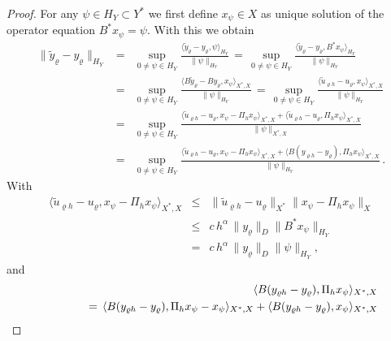 \documentclass{article}
\numberwithin{equation}{section}
\begin{document}
\begin{proof}
  For any $\psi \in H_Y \subset Y^*$ we first define $x_\psi \in X$ as unique
  solution of the operator equation $B^* x_\psi = \psi$. With this we obtain
\begin{eqnarray*}
  \| \widetilde{y}_\varrho - y_\varrho \|_{H_Y}
     & = & \sup\limits_{0 \neq \psi \in H_Y}
     \frac{\langle \widetilde{y}_\varrho - y_\varrho , \psi \rangle_{H_Y}}
     {\| \psi \|_{H_Y}} \, = \, \sup\limits_{0 \neq \psi \in H_Y}
     \frac{\langle \widetilde{y}_\varrho - y_\varrho , B^* x_\psi \rangle_{H_Y}}
     {\| \psi \|_{H_Y}} \\
  & = & \sup\limits_{0 \neq \psi \in H_Y}
        \frac{\langle B \widetilde{y}_\varrho - B y_\varrho , x_\psi
        \rangle_{X^*,X}}
         {\| \psi \|_{H_Y}} \, = \,
         \sup\limits_{0 \neq \psi \in H_Y}
        \frac{\langle \widetilde{u}_{\varrho h} - u_\varrho , x_\psi
        \rangle_{X^*,X}}
         {\| \psi \|_{H_Y}} \\
  & = & \sup\limits_{0 \neq \psi \in H_Y}
        \frac{\langle \widetilde{u}_{\varrho h} - u_\varrho ,
        x_\psi - \Pi_h x_\psi \rangle_{X^*,X}
        +
        \langle \widetilde{u}_{\varrho h} - u_\varrho ,
        \Pi_h x_\psi \rangle_{X^*,X}}
        {\| \psi \|_{X^*,X}} \\
  & = & \sup\limits_{0 \neq \psi \in H_Y}
        \frac{\langle \widetilde{u}_{\varrho h} - u_\varrho ,
        x_\psi - \Pi_h x_\psi \rangle_{X^*,X}
        +
        \langle B (y_{\varrho h} - y_\varrho) , \Pi_h x_\psi \rangle_{X^*,X}}
        {\| \psi \|_{H_Y}} \, .
\end{eqnarray*}
With
\begin{eqnarray*}
  \langle \widetilde{u}_{\varrho h} - u_\varrho ,
  x_\psi - \Pi_h x_\psi \rangle_{X^*,X}
  & \leq &
  \| \widetilde{u}_{\varrho h} - u_\varrho \|_{X^*}
           \| x_\psi - \Pi_h x_\psi \|_X \\
  & \leq & c \, h^\alpha \, \| y_\varrho \|_D \| B^* x_\psi \|_{H_Y} \\
  & = & c \, h^\alpha \, \| y_\varrho \|_D \| \psi \|_{H_Y} ,
\end{eqnarray*}
and
\begin{eqnarray*}
  && \langle B (y_{\varrho h} - y_\varrho) , \Pi_h x_\psi \rangle_{X^*,X} \\
  && \hspace*{1cm}  = \, \langle B (y_{\varrho h} - y_\varrho) ,
     \Pi_h x_\psi - x_\psi \rangle_{X^*,X}
     + \langle B (y_{\varrho h} - y_\varrho) , x_\psi \rangle_{X^*,X} \\

\end{eqnarray*}
\end{proof}
\end{document}
